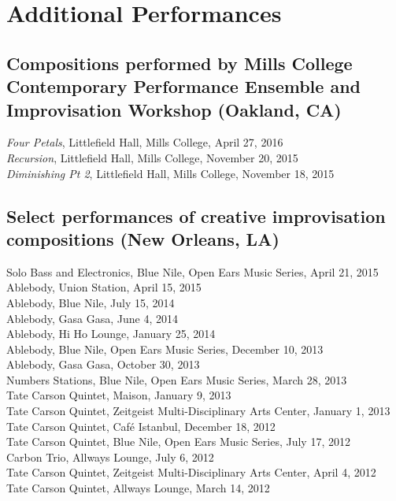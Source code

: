 \documentclass[12pt, a4paper]{article}
\newcommand{\years}[1]{\leavevmode\marginnote{\scriptsize #1}\ignorespaces}%
\begin{document}
\section*{Additional Performances}

\subsection*{Compositions performed by Mills College Contemporary Performance Ensemble and Improvisation Workshop (Oakland, CA)} 
\years{2016} \textit{Four Petals}, Littlefield Hall, Mills College, April 27, 2016 \\
\years{2015} \textit{Recursion}, Littlefield Hall, Mills College, November 20, 2015\\
\textit{Diminishing Pt 2}, Littlefield Hall, Mills College, November 18, 2015


\subsection*{Select performances of creative improvisation compositions (New Orleans, LA)}
\years{2015} Solo Bass and Electronics, Blue Nile, Open Ears Music Series, April 21, 2015 \\
Ablebody, Union Station, April 15, 2015\\
\years{2014} Ablebody, Blue Nile, July 15, 2014\\
Ablebody, Gasa Gasa, June 4, 2014\\
Ablebody, Hi Ho Lounge, January 25, 2014 \\
\years{2013} Ablebody, Blue Nile, Open Ears Music Series, December 10, 2013\\
Ablebody, Gasa Gasa, October 30, 2013  \\
Numbers Stations, Blue Nile, Open Ears Music Series, March 28, 2013\\
Tate Carson Quintet, Maison, January 9, 2013  \\
Tate Carson Quintet, Zeitgeist Multi-Disciplinary Arts Center, January 1, 2013 \\
\years{2012}
Tate Carson Quintet, Café Istanbul, December 18, 2012  \\
Tate Carson Quintet, Blue Nile, Open Ears Music Series, July 17, 2012\\
Carbon Trio, Allways Lounge, July 6, 2012\\
Tate Carson Quintet, Zeitgeist Multi-Disciplinary Arts Center, April 4, 2012\\
Tate Carson Quintet, Allways Lounge, March 14, 2012 
\end{document}
